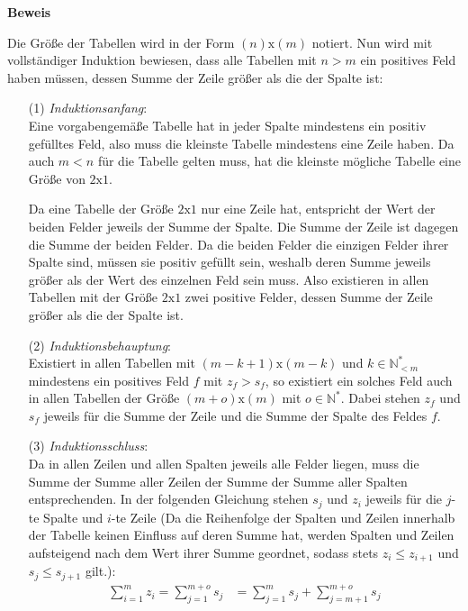 \documentclass[10pt, a4paper, reqno]{amsart}
\makeatletter
\renewcommand\proofname{Beweis}
\renewenvironment{proof}[1][\proofname]{\par
\pushQED{\qed}%
\normalfont \topsep6\p@\@plus6\p@\relax
\trivlist
\item\relax
{\bfseries#1}\hspace\labelsep\ignorespaces
}{%
\popQED\endtrivlist\@endpefalse
}
\makeatother
\begin{document}
\begin{proof}
  Die Größe der Tabellen wird in der Form $(n)\text{x}(m)$ notiert. Nun wird
  mit vollständiger Induktion bewiesen, dass alle Tabellen mit $n > m$ ein positives Feld
  haben müssen, dessen Summe der Zeile größer als die der Spalte ist:
  \begin{itemize}[itemsep=2ex]
  \item[(1)]\emph{Induktionsanfang}:\\
    Eine vorgabengemäße Tabelle hat in jeder Spalte mindestens ein positiv
    gefülltes Feld, also muss die kleinste Tabelle mindestens eine Zeile haben.
    Da auch $m<n$ für die Tabelle gelten muss, hat die kleinste mögliche Tabelle
    eine Größe von $2\text{x}1$.

    Da eine Tabelle der Größe $2\text{x}1$ nur eine Zeile hat, entspricht der
    Wert der beiden Felder jeweils der Summe der Spalte. Die Summe der Zeile ist
    dagegen die Summe der beiden Felder. Da die beiden Felder die einzigen Felder ihrer Spalte sind, müssen sie
    positiv gefüllt sein, weshalb deren Summe jeweils größer als der Wert des
    einzelnen Feld sein muss. Also existieren in allen Tabellen mit der Größe
    $2\text{x}1$ zwei positive Felder, dessen Summe der Zeile größer als die der
    Spalte ist.
  \item[(2)]\emph{Induktionsbehauptung}:\\
    Existiert in allen Tabellen mit $(m-k+1)\text{x}(m-k)$ und $k∈ℕ^*_{<m}$
    mindestens ein positives Feld $f$ mit $z_f>s_f$, so existiert ein solches Feld auch in
    allen Tabellen der Größe $(m+o)\text{x}(m)$ mit $o∈ℕ^*$. Dabei stehen $z_f$
    und $s_f$ jeweils für die Summe der Zeile und die Summe der Spalte des Feldes $f$.
  \item[(3)]\emph{Induktionsschluss}:\\
    Da in allen Zeilen und allen Spalten jeweils alle Felder liegen, muss die
    Summe der Summe aller Zeilen der Summe der Summe aller Spalten
    entsprechenden. In der folgenden Gleichung stehen $s_j$ und $z_i$ jeweils
    für die $j$-te Spalte und $i$-te Zeile (Da die Reihenfolge der Spalten
    und Zeilen innerhalb der Tabelle keinen Einfluss auf deren Summe hat, werden
    Spalten und Zeilen aufsteigend nach dem Wert ihrer Summe geordnet, sodass
    stets $z_i\leq z_{i+1}$ und $s_j\leq s_{j+1}$ gilt.):
    \begin{align*}
      \sum_{i=1}^{m}z_i=\sum_{j=1}^{m+o}s_j&=\sum_{j=1}^{m}s_j+\sum_{j=m+1}^{m+o}s_j\\

\end{align*}
\end{itemize}
\end{proof}
\end{document}

